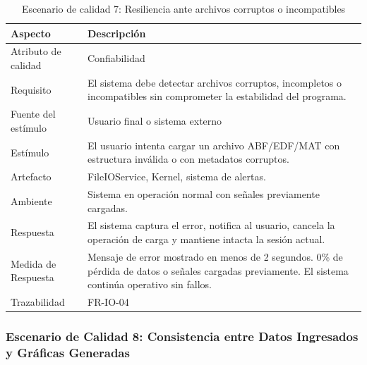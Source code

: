 \documentclass[11pt,a4paper]{article}
\DeclareRobustCommand{\_}{\textunderscore\allowbreak}
\begin{document}
\begin{table}[H]
\centering
\caption{Escenario de calidad 7: Resiliencia ante archivos corruptos o incompatibles}
\label{tab:escenario7}
\begin{tabularx}{\textwidth}{|l|X|}
\hline
\textbf{Aspecto} & \textbf{Descripción} \\
\hline
Atributo de calidad & Confiabilidad \\
\hline
Requisito & El sistema debe detectar archivos corruptos, incompletos o incompatibles sin comprometer la estabilidad del programa. \\
\hline
Fuente del estímulo & Usuario final o sistema externo \\
\hline
Estímulo & El usuario intenta cargar un archivo ABF/EDF/MAT con estructura inválida o con metadatos corruptos. \\
\hline
Artefacto & FileIOService, Kernel, sistema de alertas. \\
\hline
Ambiente & Sistema en operación normal con señales previamente cargadas. \\
\hline
Respuesta & El sistema captura el error, notifica al usuario, cancela la operación de carga y mantiene intacta la sesión actual. \\
\hline
Medida de Respuesta & Mensaje de error mostrado en menos de 2 segundos. 0\% de pérdida de datos o señales cargadas previamente. El sistema continúa operativo sin fallos. \\
\hline
Trazabilidad & FR-IO-04  \\
\hline
\end{tabularx}
\end{table}

\subsubsection{Escenario de Calidad 8: Consistencia entre Datos Ingresados y Gráficas Generadas}
\end{document}
